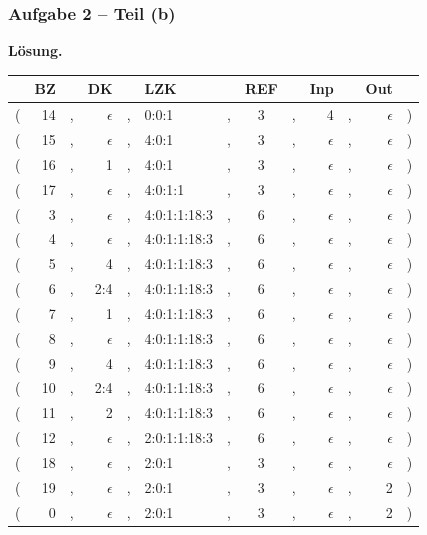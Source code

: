 \documentclass{beamer}
\newcommand*\head{\rowfont{\bfseries}}
\begin{document}
\begin{frame} \frametitle{Aufgabe 2 -- Teil (b)}
	\footnotesize
	\textbf{Lösung.}
	\scriptsize
	\begin{center}
		\begin{tabu}{rrcrclcccrcrl}
			\head & BZ && DK && LZK && REF && Inp && Out & \\ \hline
			( & 14 &,& $\epsilon$ &,& 0:0:1 &,& 3 &,& 4 &,& $\epsilon$ & ) \\
			( & 15 &,& $\epsilon$ &,& 4:0:1 &,& 3 &,& $\epsilon$ &,& $\epsilon$ & ) \\
			( & 16 &,& 1 &,& 4:0:1 &,& 3 &,& $\epsilon$ &,& $\epsilon$ & ) \\
			( & 17 &,& $\epsilon$ &,& 4:0:1:1 &,& 3 &,& $\epsilon$ &,& $\epsilon$ & ) \\
			( & 3 &,& $\epsilon$ &,& 4:0:1:1:18:3 &,& 6 &,& $\epsilon$ &,& $\epsilon$ & ) \\
			( & 4 &,& $\epsilon$ &,& 4:0:1:1:18:3 &,& 6 &,& $\epsilon$ &,& $\epsilon$ & ) \\
			( & 5 &,& 4 &,& 4:0:1:1:18:3 &,& 6 &,& $\epsilon$ &,& $\epsilon$ & ) \\
			( & 6 &,& 2:4 &,& 4:0:1:1:18:3 &,& 6 &,& $\epsilon$ &,& $\epsilon$ & ) \\
			( & 7 &,& 1 &,& 4:0:1:1:18:3 &,& 6 &,& $\epsilon$ &,& $\epsilon$ & ) \\
			( & 8 &,& $\epsilon$ &,& 4:0:1:1:18:3 &,& 6 &,& $\epsilon$ &,& $\epsilon$ & ) \\
			( & 9 &,& 4 &,& 4:0:1:1:18:3 &,& 6 &,& $\epsilon$ &,& $\epsilon$ & ) \\
			( & 10 &,& 2:4 &,& 4:0:1:1:18:3 &,& 6 &,& $\epsilon$ &,& $\epsilon$ & ) \\
			( & 11 &,& 2 &,& 4:0:1:1:18:3 &,& 6 &,& $\epsilon$ &,& $\epsilon$ & ) \\
			( & 12 &,& $\epsilon$ &,& 2:0:1:1:18:3 &,& 6 &,& $\epsilon$ &,& $\epsilon$ & ) \\
			( & 18 &,& $\epsilon$ &,& 2:0:1 &,& 3 &,& $\epsilon$ &,& $\epsilon$ & ) \\
			( & 19 &,& $\epsilon$ &,& 2:0:1 &,& 3 &,& $\epsilon$ &,& 2 & ) \\
			( & 0 &,& $\epsilon$ &,& 2:0:1 &,& 3 &,& $\epsilon$ &,& 2 & ) \\
		\end{tabu}
	\end{center}
\end{frame}
\end{document}
